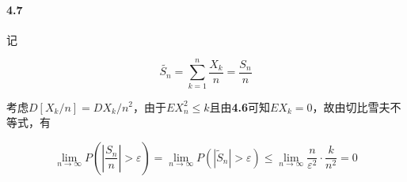 \documentclass{../notes}
\begin{document}
    \paragraph*{4.7} 记

    \begin{equation}
        \tilde{S_n} = \sum_{k=1}^n \frac{X_k}{n} = \frac{S_n}{n}
    \end{equation}

    考虑$D\left[X_k / n\right] = DX_k / n^2$，由于$EX_n^2 \leq k$且由\textbf{4.6}可知$EX_k = 0$，故由切比雪夫不等式，有

    \begin{equation}
        \lim_{n\rightarrow \infty} P\left(\left|\frac{S_n}{n}\right| > \varepsilon\right) = \lim_{n\rightarrow \infty} P\left(\left|\tilde S_n\right| > \varepsilon\right) \leq \lim_{n\rightarrow \infty}\frac{n}{\varepsilon^2}\cdot \frac{k}{n^2} = 0
    \end{equation}
\end{document}
